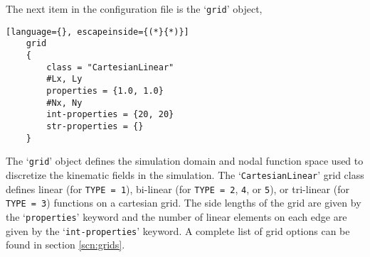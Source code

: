 The next item in the configuration file is the `\texttt{grid}' object,
\begin{lstlisting}[language={}, escapeinside={(*}{*)}]
    grid
    {
        class = "CartesianLinear"
        #Lx, Ly
        properties = {1.0, 1.0}
        #Nx, Ny
        int-properties = {20, 20}
        str-properties = {}
    }
\end{lstlisting}
The `\texttt{grid}' object defines the simulation domain and nodal function space used to discretize the kinematic fields in the simulation. The `\texttt{CartesianLinear}' grid class defines linear (for \texttt{TYPE = 1}), bi-linear (for \texttt{TYPE = 2}, \texttt{4}, or \texttt{5}), or tri-linear (for \texttt{TYPE = 3}) functions on a cartesian grid. The side lengths of the grid are given by the `\texttt{properties}' keyword and the number of linear elements on each edge are given by the `\texttt{int-properties}' keyword. A complete list of grid options can be found in section \ref{scn:grids}.


